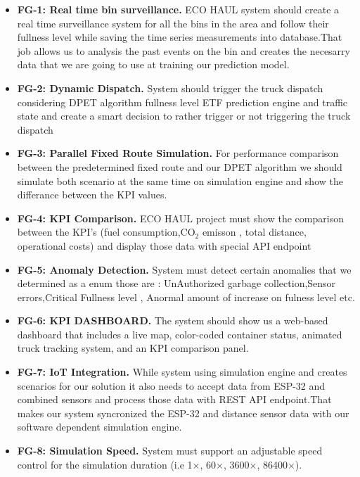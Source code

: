 \documentclass[12pt,a4paper]{report}
\begin{document}
\begin{itemize}[leftmargin=1.5cm]
  \item \textbf{FG-1: Real time bin surveillance.}
        \indent ECO HAUL system should create a real time surveillance system for all the bins in the area and follow their fullness level while saving the time series measurements into database.That job allows us to analysis the past events on the bin and creates the necesarry data that we are going to use at training our prediction model.
  \item \textbf{FG-2: Dynamic Dispatch.}
        \indent System should trigger the truck dispatch considering DPET algorithm fullness level ETF prediction engine and traffic state and create a smart decision to rather trigger or not triggering the truck dispatch
  \item \textbf{FG-3: Parallel Fixed Route Simulation.}
        \indent For performance comparison between the predetermined fixed route and our DPET algorithm we should simulate both scenario at the same time on simulation engine and show the differance between the KPI values.
  \item \textbf{FG-4: KPI Comparison.}
        \indent ECO HAUL project must show the comparison between the KPI's (fuel consumption,CO$_2$ emisson , total distance, operational costs) and display those data with special API endpoint
  \item \textbf{FG-5: Anomaly Detection.}
        \indent System must detect certain anomalies that we determined as a enum those are : UnAuthorized garbage collection,Sensor errors,Critical Fullness level , Anormal amount of increase on fulness level etc.
  \item \textbf{FG-6: KPI DASHBOARD.}
        The system should show us a web-based dashboard that includes a live map, color-coded container status, animated truck tracking system, and an KPI comparison panel.
  \item \textbf{FG-7: IoT Integration.}
        \indent While system using simulation engine and creates scenarios for our solution it also needs to accept data from ESP-32 and combined sensors and process those data with REST API endpoint.That makes our system syncronized  the ESP-32 and distance sensor data  with our software dependent simulation engine.

  \item \textbf{FG-8: Simulation Speed.}
        System must support an adjustable speed control for the simulation duration (i.e 1$\times$, 60$\times$, 3600$\times$, 86400$\times$).
\end{itemize}
\end{document}

